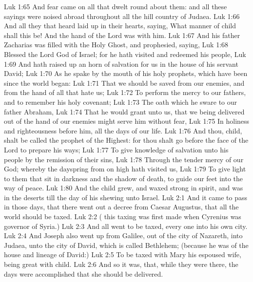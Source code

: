 \vs Luk 1:65 And fear came on all that dwelt round about them: and all these sayings were noised abroad throughout all the hill country of Judaea.
\vs Luk 1:66 And all they that heard  laid  up in their hearts, saying, What manner of child shall this be! And the hand of the Lord was with him.
\vs Luk 1:67 And his father Zacharias was filled with the Holy Ghost, and prophesied, saying,
\vs Luk 1:68 Blessed  the Lord God of Israel; for he hath visited and redeemed his people,
\vs Luk 1:69 And hath raised up an horn of salvation for us in the house of his servant David;
\vs Luk 1:70 As he spake by the mouth of his holy prophets, which have been since the world began:
\vs Luk 1:71 That we should be saved from our enemies, and from the hand of all that hate us;
\vs Luk 1:72 To perform the mercy  to our fathers, and to remember his holy covenant;
\vs Luk 1:73 The oath which he sware to our father Abraham,
\vs Luk 1:74 That he would grant unto us, that we being delivered out of the hand of our enemies might serve him without fear,
\vs Luk 1:75 In holiness and righteousness before him, all the days of our life.
\vs Luk 1:76 And thou, child, shalt be called the prophet of the Highest: for thou shalt go before the face of the Lord to prepare his ways;
\vs Luk 1:77 To give knowledge of salvation unto his people by the remission of their sins,
\vs Luk 1:78 Through the tender mercy of our God; whereby the dayspring from on high hath visited us,
\vs Luk 1:79 To give light to them that sit in darkness and  the shadow of death, to guide our feet into the way of peace.
\vs Luk 1:80 And the child grew, and waxed strong in spirit, and was in the deserts till the day of his shewing unto Israel.
\vs Luk 2:1 And it came to pass in those days, that there went out a decree from Caesar Augustus, that all the world should be taxed.
\vs Luk 2:2 ( this taxing was first made when Cyrenius was governor of Syria.)
\vs Luk 2:3 And all went to be taxed, every one into his own city.
\vs Luk 2:4 And Joseph also went up from Galilee, out of the city of Nazareth, into Judaea, unto the city of David, which is called Bethlehem; (because he was of the house and lineage of David:)
\vs Luk 2:5 To be taxed with Mary his espoused wife, being great with child.
\vs Luk 2:6 And so it was, that, while they were there, the days were accomplished that she should be delivered.

